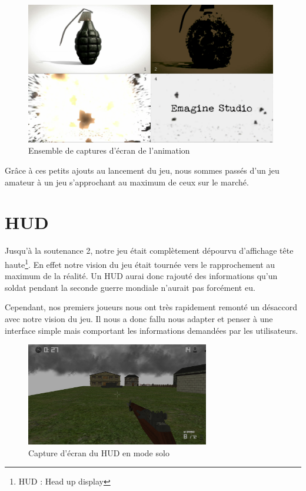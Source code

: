 \documentclass[11pt]{report}
\begin{document}
\begin{figure}[htbp]
\centering
\includegraphics[width=11cm]{anim-eie.png}
\caption{Ensemble de captures d'écran de l'animation}
\end{figure}

Grâce à ces petits ajouts au lancement du jeu, nous sommes passés d’un jeu amateur à un jeu s'approchant au maximum de ceux sur le marché.

\section{HUD}

Jusqu'à la soutenance 2, notre jeu était complètement dépourvu d'affichage tête haute\footnote{HUD : Head up display}. En effet notre vision du jeu était tournée vers le rapprochement au maximum de la réalité. Un HUD aurai donc rajouté des informations qu'un soldat pendant la seconde guerre mondiale n'aurait pas forcément eu.

Cependant, nos premiers joueurs nous ont très rapidement remonté un désaccord avec notre vision du jeu. Il nous a donc fallu nous adapter et penser à une interface simple mais comportant les informations demandées par les utilisateurs.

\begin{figure}[htbp]
\centering
\includegraphics[width=8cm]{hud.png}
\caption{Capture d'écran du HUD en mode solo}
\label{hud}
\end{figure}
\end{document}
